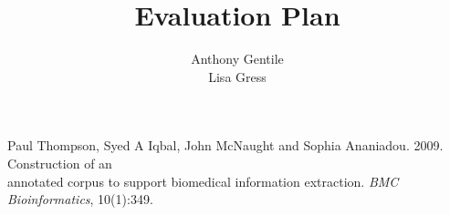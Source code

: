 \documentclass[11pt]{article}
\title{Evaluation Plan}
\author{Anthony Gentile \\ Lisa Gress}
\date{}
\begin{document}
\maketitle






\noindent Paul Thompson, Syed A Iqbal, John McNaught and Sophia Ananiadou. 2009. Construction of an \\ \indent annotated corpus to support biomedical information extraction. {\em BMC Bioinformatics}, 10(1):349.
\end{document}
